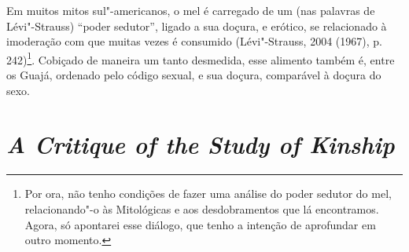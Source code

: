 Em muitos mitos sul"-americanos, o mel é carregado de um (nas palavras de
Lévi"-Strauss) ``poder sedutor'', ligado a sua doçura, e erótico, se
relacionado à imoderação com que muitas vezes é consumido (Lévi"-Strauss,
2004 (1967), p. 242)\footnote{Por ora, não tenho condições de fazer uma
  análise do poder sedutor do mel, relacionando"-o às Mitológicas e aos
  desdobramentos que lá encontramos. Agora, só apontarei esse diálogo,
  que tenho a intenção de aprofundar em outro momento.}. Cobiçado de
maneira um tanto desmedida, esse alimento também é, entre os Guajá,
ordenado pelo código sexual, e sua doçura, comparável à doçura do sexo.

\section{\emph{A Critique of the Study of Kinship}}

